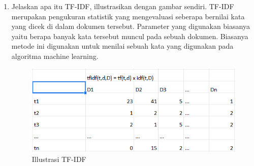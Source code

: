 \begin{enumerate}
    \item Jelaskan apa itu TF-IDF, illustrasikan dengan gambar sendiri.
    TF-IDF merupakan pengukuran statistik yang mengevaluasi seberapa bernilai kata yang dicek di dalam dokumen tersebut. Parameter yang digunakan biasanya yaitu berapa banyak kata tersebut muncul pada sebuah dokumen. Biasanya metode ini digunakan untuk menilai sebuah kata yang digunakan pada algoritma machine learning.
    \begin{figure}[ht]
        \centering
        \includegraphics[scale=0.2]{figures/1174035/chapter4/6_teori.png}
        \caption{Illustrasi TF-IDF}
        \label{contoh5}
    \end{figure}
\end{enumerate}

